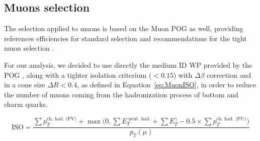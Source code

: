 \documentclass[a4paper, 10pt, openright]{report}
\begin{document}
%
%

\subsection{Muons selection} \label{section:MuSel}

The selection applied to muons is based on the Muon \ac{POG} as well, providing references efficiencies for standard selection and recommendations for the tight muon selection \cite{MuonWPs}.

For our analysis, we decided to use directly the medium ID \ac{WP} provided by the \ac{POG} \cite{MuonWPs}, along with a tighter isolation criterium ($< 0.15$) with $\Delta \beta$ correction and in a cone size $\Delta R < 0.4$, as defined in Equation~\ref{eq:MuonISO}, in order to reduce the number of muons coming from the hadronization process of bottom and charm quarks.

\begin{equation}
\label{eq:MuonISO}
\text{ISO} = \frac{\sum p_T^{\text{ch. had. (PV)}} + \max \big (0, \sum E_T^{\text{ neut. had.}} + \sum E_T^{\gamma}  - 0.5 \times \sum p_T^\text{ch. had. (PU)} \big )}{p_T(\mu)}
\end{equation}
\end{document}
